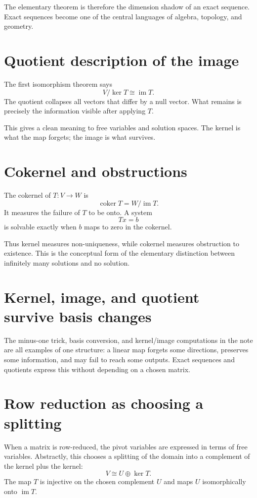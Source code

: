 The elementary theorem is therefore the dimension shadow of an exact sequence.  Exact sequences become one of the central languages of algebra, topology, and geometry.

\section{Quotient description of the image}

The first isomorphism theorem says
\[
  V/\ker T\cong \operatorname{im}T.
\]
The quotient collapses all vectors that differ by a null vector.  What remains is precisely the information visible after applying $T$.

This gives a clean meaning to free variables and solution spaces.  The kernel is what the map forgets; the image is what survives.

\section{Cokernel and obstructions}

The cokernel of $T:V\to W$ is
\[
  \operatorname{coker}T=W/\operatorname{im}T.
\]
It measures the failure of $T$ to be onto.  A system
\[
  Tx=b
\]
is solvable exactly when $b$ maps to zero in the cokernel.

Thus kernel measures non-uniqueness, while cokernel measures obstruction to existence.  This is the conceptual form of the elementary distinction between infinitely many solutions and no solution.

\section{Kernel, image, and quotient survive basis changes}

The minus-one trick, basis conversion, and kernel/image computations in the note are all examples of one structure: a linear map forgets some directions, preserves some information, and may fail to reach some outputs.  Exact sequences and quotients express this without depending on a chosen matrix.

\section{Row reduction as choosing a splitting}

When a matrix is row-reduced, the pivot variables are expressed in terms of free variables.  Abstractly, this chooses a splitting of the domain into a complement of the kernel plus the kernel:
\[
  V\cong U\oplus \ker T.
\]
The map $T$ is injective on the chosen complement $U$ and maps $U$ isomorphically onto $\operatorname{im}T$.

